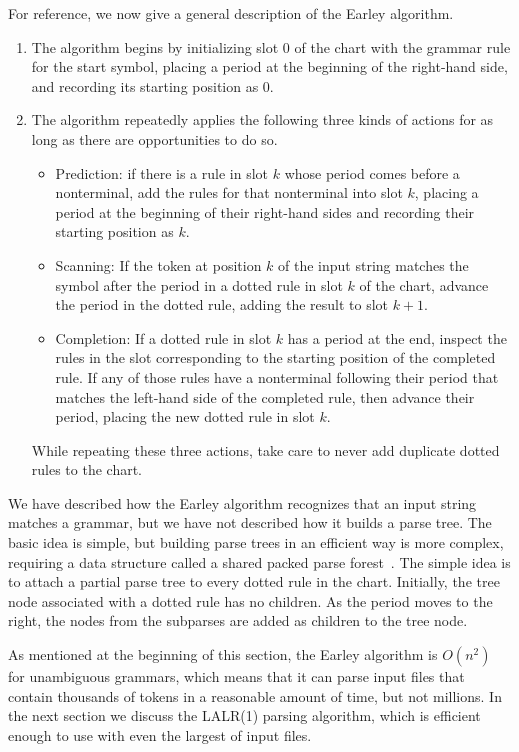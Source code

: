 \documentclass[7x10]{TimesAPriori_MIT}%
\numberwithin{theorem}{chapter}
\numberwithin{definition}{chapter}
\numberwithin{equation}{chapter}
\begin{document}
{For reference, we now give a general description of the Earley
algorithm.
\begin{enumerate}
\item The algorithm begins by initializing slot $0$ of the chart with the
  grammar rule for the start symbol, placing a period at the beginning
  of the right-hand side, and recording its starting position as $0$.
  
\item The algorithm repeatedly applies the following three kinds of
  actions for as long as there are opportunities to do so.
  \begin{itemize}
  \item Prediction: if there is a rule in slot $k$ whose period comes
    before a nonterminal, add the rules for that nonterminal into slot
    $k$, placing a period at the beginning of their right-hand sides
    and recording their starting position as $k$.
  \item Scanning: If the token at position $k$ of the input string
    matches the symbol after the period in a dotted rule in slot $k$
    of the chart, advance the period in the dotted rule, adding
    the result to slot $k+1$.
  \item Completion: If a dotted rule in slot $k$ has a period at the
    end, inspect the rules in the slot corresponding to the starting
    position of the completed rule. If any of those rules have a
    nonterminal following their period that matches the left-hand side
    of the completed rule, then advance their period, placing the new
    dotted rule in slot $k$.
  \end{itemize}
  While repeating these three actions, take care to never add
  duplicate dotted rules to the chart.
\end{enumerate}

We have described how the Earley algorithm recognizes that an input
string matches a grammar, but we have not described how it builds a
parse tree. The basic idea is simple, but building parse trees in an
efficient way is more complex, requiring a data structure called a
shared packed parse forest~\citep{Tomita:1985qr}.  The simple idea is
to attach a partial parse tree to every dotted rule in the chart.
Initially, the tree node associated with a dotted rule has no
children. As the period moves to the right, the nodes from the
subparses are added as children to the tree node.

As mentioned at the beginning of this section, the Earley algorithm is
$O(n^2)$ for unambiguous grammars, which means that it can parse input
files that contain thousands of tokens in a reasonable amount of time,
but not millions.
%
In the next section we discuss the LALR(1) parsing algorithm, which is
efficient enough to use with even the largest of input files.


}
\end{document}

